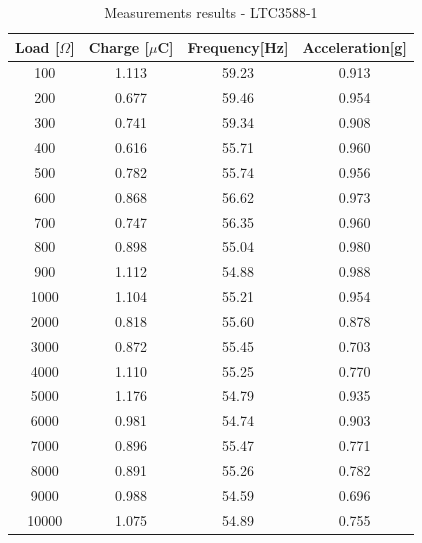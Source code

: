 \documentclass[12pt,a4paper]{article}
\begin{document}
\begin{table}[ht!]
\centering

\begin{tabular}{|c|c|c|c|}
    \hline
    \textbf{Load} [$\Omega$] & \textbf{Charge} [$\mu$C]& \textbf{Frequency}[Hz] & \textbf{Acceleration}[g] \\
    \hline
    100 & 1.113 & 59.23 & 0.913 \\
    \hline
    200 & 0.677 & 59.46 & 0.954 \\
    \hline
    300 & 0.741 & 59.34 & 0.908 \\
    \hline
    400 & 0.616 & 55.71 & 0.960 \\
    \hline
    500 & 0.782 & 55.74 & 0.956 \\
    \hline
    600 & 0.868 & 56.62 & 0.973 \\
    \hline
    700 & 0.747 & 56.35 & 0.960 \\
    \hline
    800 & 0.898 & 55.04 & 0.980 \\
    \hline
    900 & 1.112 & 54.88 & 0.988 \\
    \hline
    1000 & 1.104 & 55.21 & 0.954 \\
    \hline
    2000 & 0.818 & 55.60 & 0.878 \\
    \hline
    3000 & 0.872 & 55.45 & 0.703 \\
    \hline
    4000 & 1.110 & 55.25 & 0.770 \\
    \hline
    5000 & 1.176 & 54.79 & 0.935 \\
    \hline
    6000 & 0.981 & 54.74 & 0.903 \\
    \hline
    7000 & 0.896 & 55.47 & 0.771 \\
    \hline
    8000 & 0.891 & 55.26 & 0.782 \\
    \hline
    9000 & 0.988 & 54.59 & 0.696 \\
    \hline
    10000 & 1.075 & 54.89 & 0.755 \\
    \hline
\end{tabular}
\caption{Measurements results - LTC3588-1}
\label{tab:ltc3588results}
\end{table}
\end{document}
